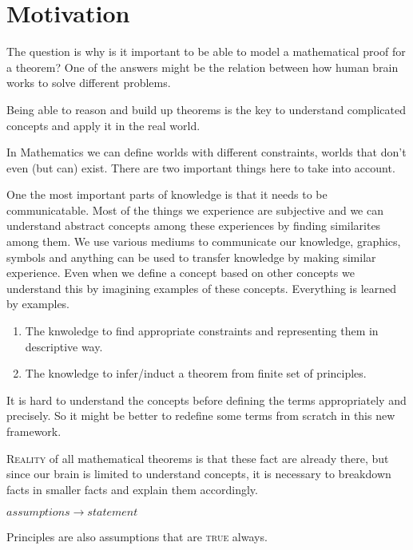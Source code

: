 \documentclass{article}
\begin{document}
\section{Motivation}
The question is why is it important to be able to model a mathematical proof for a theorem?
One of the answers might be the relation between how human brain works to solve different problems.

Being able to reason and build up theorems is the key to understand complicated concepts and apply it in the real world. 

In Mathematics we can define worlds with different constraints, worlds that don't even (but can) exist. There are two important things here to take into account. 


One the most important parts of knowledge is that it needs to be communicatable. Most of the things we experience are subjective and we can understand abstract concepts among these experiences by finding similarites among them. We use various mediums to communicate our knowledge, graphics, symbols and anything can be used to transfer knowledge by making similar experience. Even when we define a concept based on other concepts we understand this by imagining examples of these concepts. Everything is learned by examples.

\begin{enumerate}
\item The knwoledge to find appropriate constraints and representing them in descriptive way.
\item The knowledge to infer/induct a theorem from finite set of principles.
\end{enumerate}


It is hard to understand the concepts before defining the terms appropriately and precisely. So it might be better to redefine some terms from scratch in this new framework.


\textsc{Reality} of all mathematical theorems is that these fact are already there, but since our brain is limited to understand concepts, it is necessary to breakdown facts in smaller facts and explain them accordingly.



\begin{center}\(assumptions \rightarrow statement\)\end{center}

Principles are also assumptions that are \textsc{true} always.
\end{document}
